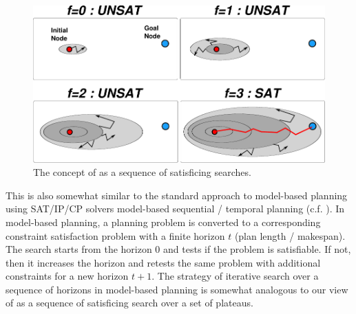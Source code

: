 \begin{figure}[htbp]
 \includegraphics{img/astar/plateau-5.pdf}
 \caption{The concept of \astar as a sequence of satisficing searches.}
 \label{fig:astar-sat}
\end{figure}


This is also somewhat similar to the standard approach to model-based planning using SAT/IP/CP solvers model-based sequential / temporal planning (c.f. \cite{KautzS1992,van2005optiplan}).
In model-based planning, a
planning problem is converted to a corresponding constraint satisfaction problem with a finite horizon $t$ (plan
length / makespan). The search starts from the horizon 0 and tests if the problem is satisfiable. If not, then it
increases the horizon and retests the same problem with additional constraints for a new horizon $t+1$. 
The strategy of iterative search over a sequence of horizons in model-based planning is somewhat analogous to our view of \astar as a sequence of satisficing search over a set of plateaus.






